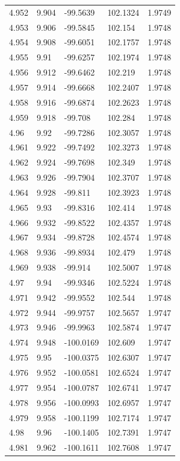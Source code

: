 \begin{tabular}{lllll}
4.952 & 9.904 & -99.5639 & 102.1324 & 1.9749 \\
4.953 & 9.906 & -99.5845 & 102.154 & 1.9748 \\
4.954 & 9.908 & -99.6051 & 102.1757 & 1.9748 \\
4.955 & 9.91 & -99.6257 & 102.1974 & 1.9748 \\
4.956 & 9.912 & -99.6462 & 102.219 & 1.9748 \\
4.957 & 9.914 & -99.6668 & 102.2407 & 1.9748 \\
4.958 & 9.916 & -99.6874 & 102.2623 & 1.9748 \\
4.959 & 9.918 & -99.708 & 102.284 & 1.9748 \\
4.96 & 9.92 & -99.7286 & 102.3057 & 1.9748 \\
4.961 & 9.922 & -99.7492 & 102.3273 & 1.9748 \\
4.962 & 9.924 & -99.7698 & 102.349 & 1.9748 \\
4.963 & 9.926 & -99.7904 & 102.3707 & 1.9748 \\
4.964 & 9.928 & -99.811 & 102.3923 & 1.9748 \\
4.965 & 9.93 & -99.8316 & 102.414 & 1.9748 \\
4.966 & 9.932 & -99.8522 & 102.4357 & 1.9748 \\
4.967 & 9.934 & -99.8728 & 102.4574 & 1.9748 \\
4.968 & 9.936 & -99.8934 & 102.479 & 1.9748 \\
4.969 & 9.938 & -99.914 & 102.5007 & 1.9748 \\
4.97 & 9.94 & -99.9346 & 102.5224 & 1.9748 \\
4.971 & 9.942 & -99.9552 & 102.544 & 1.9748 \\
4.972 & 9.944 & -99.9757 & 102.5657 & 1.9747 \\
4.973 & 9.946 & -99.9963 & 102.5874 & 1.9747 \\
4.974 & 9.948 & -100.0169 & 102.609 & 1.9747 \\
4.975 & 9.95 & -100.0375 & 102.6307 & 1.9747 \\
4.976 & 9.952 & -100.0581 & 102.6524 & 1.9747 \\
4.977 & 9.954 & -100.0787 & 102.6741 & 1.9747 \\
4.978 & 9.956 & -100.0993 & 102.6957 & 1.9747 \\
4.979 & 9.958 & -100.1199 & 102.7174 & 1.9747 \\
4.98 & 9.96 & -100.1405 & 102.7391 & 1.9747 \\
4.981 & 9.962 & -100.1611 & 102.7608 & 1.9747 \\

\end{tabular}
